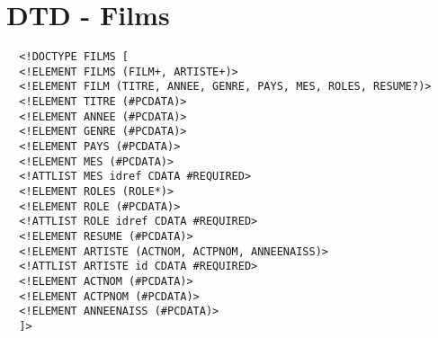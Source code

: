 \chapter{DTD - Films}
\begin{verbatim}
  <!DOCTYPE FILMS [
  <!ELEMENT FILMS (FILM+, ARTISTE+)>
  <!ELEMENT FILM (TITRE, ANNEE, GENRE, PAYS, MES, ROLES, RESUME?)>
  <!ELEMENT TITRE (#PCDATA)>
  <!ELEMENT ANNEE (#PCDATA)>
  <!ELEMENT GENRE (#PCDATA)>
  <!ELEMENT PAYS (#PCDATA)>
  <!ELEMENT MES (#PCDATA)>
  <!ATTLIST MES idref CDATA #REQUIRED>
  <!ELEMENT ROLES (ROLE*)>
  <!ELEMENT ROLE (#PCDATA)>
  <!ATTLIST ROLE idref CDATA #REQUIRED>
  <!ELEMENT RESUME (#PCDATA)>
  <!ELEMENT ARTISTE (ACTNOM, ACTPNOM, ANNEENAISS)>
  <!ATTLIST ARTISTE id CDATA #REQUIRED>
  <!ELEMENT ACTNOM (#PCDATA)>
  <!ELEMENT ACTPNOM (#PCDATA)>
  <!ELEMENT ANNEENAISS (#PCDATA)>
  ]>
\end{verbatim}